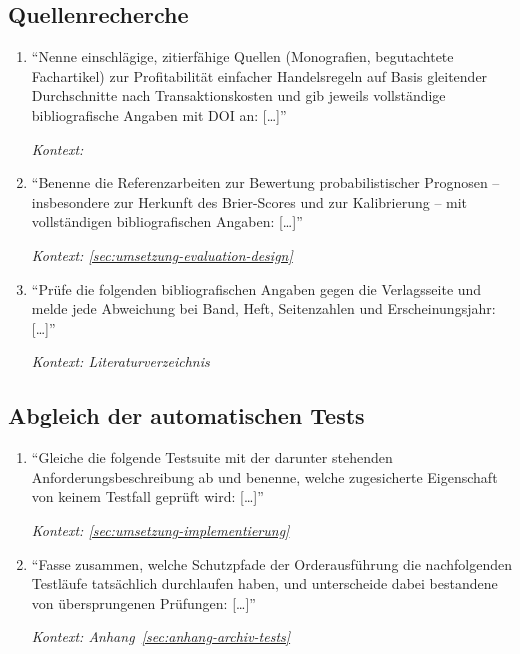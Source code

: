 \subsection{Quellenrecherche}
\label{sec:prompts-gemini-literatur}
\begin{enumerate}
    \item \enquote{Nenne einschlägige, zitierfähige Quellen (Monografien,
            begutachtete Fachartikel) zur Profitabilität einfacher
            Handelsregeln auf Basis gleitender Durchschnitte nach
            Transaktionskosten und gib jeweils vollständige bibliografische
            Angaben mit DOI an: [\dots]}
            \par\hfill\textit{Kontext: }

    \item \enquote{Benenne die Referenzarbeiten zur Bewertung
            probabilistischer Prognosen -- insbesondere zur Herkunft des
            Brier-Scores und zur Kalibrierung -- mit vollständigen
            bibliografischen Angaben: [\dots]}
            \par\hfill\textit{Kontext:
            \cref{sec:umsetzung-evaluation-design}}

    \item \enquote{Prüfe die folgenden bibliografischen Angaben gegen die
            Verlagsseite und melde jede Abweichung bei Band, Heft,
            Seitenzahlen und Erscheinungsjahr: [\dots]}
            \par\hfill\textit{Kontext: Literaturverzeichnis}
\end{enumerate}

\subsection{Abgleich der automatischen Tests}
\label{sec:prompts-gemini-tests}
\begin{enumerate}
    \item \enquote{Gleiche die folgende Testsuite mit der darunter
            stehenden Anforderungsbeschreibung ab und benenne, welche
            zugesicherte Eigenschaft von keinem Testfall geprüft wird:
            [\dots]}
            \par\hfill\textit{Kontext: \cref{sec:umsetzung-implementierung}}

    \item \enquote{Fasse zusammen, welche Schutzpfade der Orderausführung die
            nachfolgenden Testläufe tatsächlich durchlaufen haben, und
            unterscheide dabei bestandene von übersprungenen Prüfungen:
            [\dots]}
            \par\hfill\textit{Kontext: Anhang~\ref{sec:anhang-archiv-tests}}
\end{enumerate}

